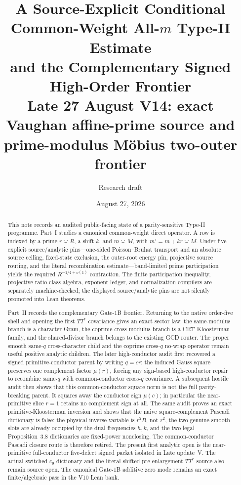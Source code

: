 \documentclass[11pt]{article}
\title{\textbf{A Source-Explicit Conditional Common-Weight All-$m$ Type-II Estimate\\
and the Complementary Signed High-Order Frontier}\\
\large Late 27 August V14: exact Vaughan affine-prime source and prime-modulus M\"obius two-outer frontier}
\author{Research draft}
\date{August 27, 2026}
\theoremstyle{definition}
\newcommand{\1}{\mathbf 1}
\begin{document}
\maketitle


\begin{abstract}
This note records an audited public-facing state of a parity-sensitive Type-II
programme.  Part~I studies a canonical common-weight direct operator.  A row
is indexed by a prime $r\asymp R$, a shift $k$, and $m\asymp M$, with
$m'=m+kr\asymp M$.  Under five explicit source/analytic pins---one-sided
Poisson--Bruhat transport and an absolute source ceiling, fixed-state
exclusion, the outer-root energy pin, projective source routing, and the
literal recombination estimate---band-limited prime participation yields the
required $R^{-1/4+o(1)}$ contraction.  The finite participation inequality,
projective ratio-class algebra, exponent ledger, and normalization compilers
are separately machine-checked; the displayed source/analytic pins are not
silently promoted into Lean theorems.

Part~II records the complementary Gate-1B frontier.  Returning to the
native order-five shell and opening the first $TT^\ast$ covariance gives an
exact sector law: the same-modulus branch is a character Gram, the coprime
cross-modulus branch is a CRT Kloosterman family, and the shared-divisor branch
belongs to the existing GCD router.  The proper smooth same-$q$ cross-character
child and the coprime cross-$q$ no-wrap operator remain useful positive
analytic children.  The later high-conductor audit first recovered a signed
primitive-conductor parent by writing $q=cr$: the induced Gauss square preserves
one complement factor $\mu(r)$, forcing any sign-based high-conductor repair to
recombine same-$q$ with common-conductor cross-$q$ covariance.  A subsequent
hostile audit then shows that this common-conductor square norm is not the full
parity-breaking parent.  It squares away the conductor sign $\mu(c)$; in
particular the near-primitive slice $r=1$ retains no complement sign at all.
The same audit proves an exact primitive-Kloosterman inversion and shows that
the naive square-complement Pascadi dictionary is false: the physical inverse
variable is $r^2B$, not $r^2$, the two genuine smooth slots are already occupied
by the dual frequencies $h,k$, and the two legal Proposition~3.8 dictionaries
are fixed-power nonclosing.  The common-conductor Pascadi closure route is
therefore retired.  The present first analytic open is the near-primitive
full-conductor five-defect signed packet isolated in Late update~V.  The actual
switched $c_9$ dictionary and the literal shifted pre-enlargement $TT^\ast$
source also remain source open.  The canonical Gate-1B additive zero mode
remains an exact finite/algebraic pass in the V10 Lean bank.


\end{abstract}
\end{document}
